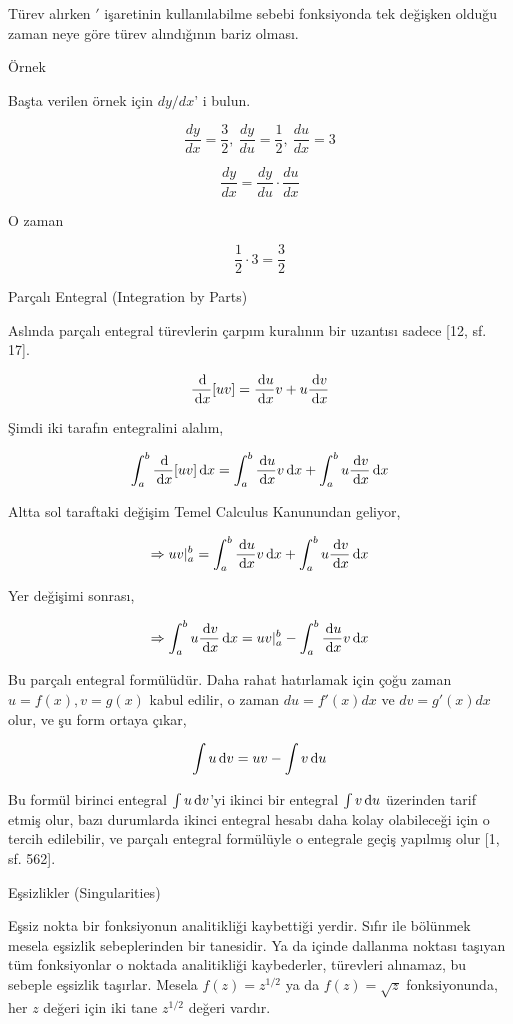 \documentclass[12pt,fleqn]{article}\usepackage{../../common}
\begin{document}
Türev alırken $'$ işaretinin kullanılabilme sebebi fonksiyonda tek değişken
olduğu zaman neye göre türev alındığının bariz olması.

Örnek 

Başta verilen örnek için $dy/dx$' i bulun. 

$$ \frac{ dy}{dx} = \frac{ 3}{2}, \
\frac{dy}{du} = \frac{ 1}{2}, \
\frac{ du}{dx} = 3
 $$

$$ \frac{ dy}{dx} = \frac{ dy}{du} \cdot \frac{ du}{dx} $$

O zaman 

$$ \frac{ 1}{2} \cdot 3 = \frac{ 3}{2} $$

\newpage

Parçalı Entegral (Integration by Parts)

Aslında parçalı entegral türevlerin çarpım kuralının bir uzantısı sadece
[12, sf. 17]. 

$$
\frac{\,\mathrm{d} }{\,\mathrm{d} x} [u v] = \frac{\,\mathrm{d} u}{\,\mathrm{d} x} v + u \frac{\,\mathrm{d} v}{\,\mathrm{d} x}
$$

Şimdi iki tarafın entegralini alalım,

$$
\int_{a}^{b} \frac{\,\mathrm{d}}{\,\mathrm{d} x} [u v] \,\mathrm{d} x =
\int_{a}^{b} \frac{\,\mathrm{d} u}{\,\mathrm{d} x} v \,\mathrm{d} x +
\int_{a}^{b} u \frac{\,\mathrm{d} v}{\,\mathrm{d} x} \,\mathrm{d} x 
$$

Altta sol taraftaki değişim Temel Calculus Kanunundan geliyor,

$$
\Rightarrow u v |_{a}^{b} =
\int_{a}^{b} \frac{\,\mathrm{d} u}{\,\mathrm{d} x} v \,\mathrm{d} x + 
\int_{a}^{b} u \frac{\,\mathrm{d} v}{\,\mathrm{d} x} \,\mathrm{d} x 
$$

Yer değişimi sonrası,

$$
\Rightarrow \int_{a}^{b} u \frac{\,\mathrm{d} v}{\,\mathrm{d} x} \,\mathrm{d} x =
u v |_{a}^{b}  -
\int_{a}^{b} \frac{\,\mathrm{d} u}{\,\mathrm{d} x} v \,\mathrm{d} x
$$

Bu parçalı entegral formülüdür. Daha rahat hatırlamak için çoğu zaman
$u=f(x),v=g(x)$ kabul edilir, o zaman $du = f'(x)dx$ ve $dv = g'(x)dx$
olur, ve şu form ortaya çıkar,

$$ \int u \,\mathrm{d} v = uv - \int v \,\mathrm{d} u$$

Bu formül birinci entegral $\int u \,\mathrm{d} v$'yi ikinci bir entegral $\int v \,\mathrm{d} u$
üzerinden tarif etmiş olur, bazı durumlarda ikinci entegral hesabı daha kolay
olabileceği için o tercih edilebilir, ve parçalı entegral formülüyle o entegrale
geçiş yapılmış olur [1, sf. 562].

\newpage

Eşsizlikler (Singularities) 

Eşsiz nokta bir fonksiyonun analitikliği kaybettiği yerdir. Sıfır ile
bölünmek mesela eşsizlik sebeplerinden bir tanesidir. Ya da içinde dallanma
noktası taşıyan tüm fonksiyonlar o noktada analitikliği kaybederler,
türevleri alınamaz, bu sebeple eşsizlik taşırlar. Mesela $f(z) = z^{1/2}$
ya da $f(z) = \sqrt{z}$ fonksiyonunda, her $z$ değeri için iki tane
$z^{1/2}$ değeri vardır.
\end{document}
